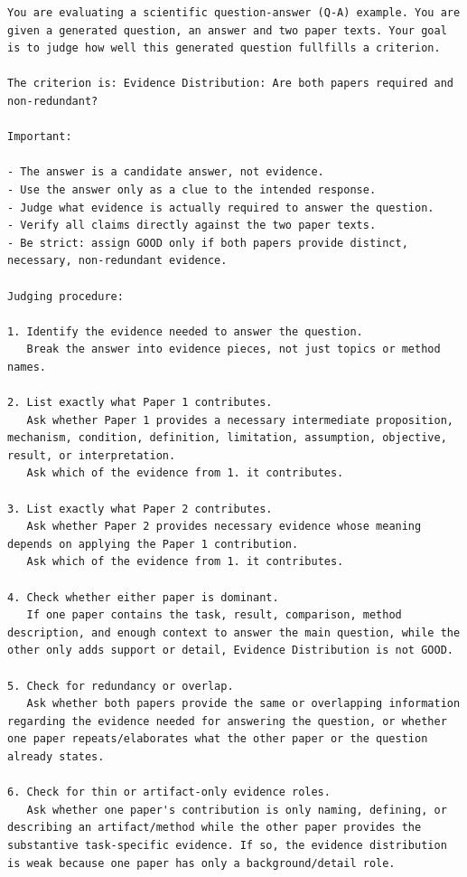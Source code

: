 \begin{lstlisting}[caption={Evidence Distribution Prompt}, label={lst:EvidenceDistributionPrompt}]
    You are evaluating a scientific question-answer (Q-A) example. You are given a generated question, an answer and two paper texts. Your goal is to judge how well this generated question fullfills a criterion.

The criterion is: Evidence Distribution: Are both papers required and non-redundant?

Important:

- The answer is a candidate answer, not evidence.
- Use the answer only as a clue to the intended response.
- Judge what evidence is actually required to answer the question.
- Verify all claims directly against the two paper texts.
- Be strict: assign GOOD only if both papers provide distinct, necessary, non-redundant evidence.

Judging procedure:

1. Identify the evidence needed to answer the question.
   Break the answer into evidence pieces, not just topics or method names.

2. List exactly what Paper 1 contributes.
   Ask whether Paper 1 provides a necessary intermediate proposition, mechanism, condition, definition, limitation, assumption, objective, result, or interpretation.
   Ask which of the evidence from 1. it contributes.

3. List exactly what Paper 2 contributes.
   Ask whether Paper 2 provides necessary evidence whose meaning depends on applying the Paper 1 contribution.
   Ask which of the evidence from 1. it contributes.

4. Check whether either paper is dominant.
   If one paper contains the task, result, comparison, method description, and enough context to answer the main question, while the other only adds support or detail, Evidence Distribution is not GOOD.

5. Check for redundancy or overlap.
   Ask whether both papers provide the same or overlapping information regarding the evidence needed for answering the question, or whether one paper repeats/elaborates what the other paper or the question already states.

6. Check for thin or artifact-only evidence roles.
   Ask whether one paper's contribution is only naming, defining, or describing an artifact/method while the other paper provides the substantive task-specific evidence. If so, the evidence distribution is weak because one paper has only a background/detail role.


\end{lstlisting}
